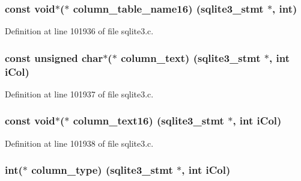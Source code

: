 \subsubsection[{column\+\_\+table\+\_\+name16}]{\setlength{\rightskip}{0pt plus 5cm}const void$\ast$($\ast$ column\+\_\+table\+\_\+name16) ({\bf sqlite3\+\_\+stmt} $\ast$, int)}\label{structsqlite3__api__routines_a5ab49c39dc125f958df10ecc88fd9b12}


Definition at line 101936 of file sqlite3.\+c.

\hypertarget{structsqlite3__api__routines_a66f8d504265c0869a251f94e96b1873f}{}
\subsubsection[{column\+\_\+text}]{\setlength{\rightskip}{0pt plus 5cm}const unsigned char$\ast$($\ast$ column\+\_\+text) ({\bf sqlite3\+\_\+stmt} $\ast$, int i\+Col)}\label{structsqlite3__api__routines_a66f8d504265c0869a251f94e96b1873f}


Definition at line 101937 of file sqlite3.\+c.

\hypertarget{structsqlite3__api__routines_a78b3c83097ee83e73ed99b4267d229e5}{}
\subsubsection[{column\+\_\+text16}]{\setlength{\rightskip}{0pt plus 5cm}const void$\ast$($\ast$ column\+\_\+text16) ({\bf sqlite3\+\_\+stmt} $\ast$, int i\+Col)}\label{structsqlite3__api__routines_a78b3c83097ee83e73ed99b4267d229e5}


Definition at line 101938 of file sqlite3.\+c.

\hypertarget{structsqlite3__api__routines_a492811fa922de6f677e915b1cf9a53a0}{}
\subsubsection[{column\+\_\+type}]{\setlength{\rightskip}{0pt plus 5cm}int($\ast$ column\+\_\+type) ({\bf sqlite3\+\_\+stmt} $\ast$, int i\+Col)}\label{structsqlite3__api__routines_a492811fa922de6f677e915b1cf9a53a0}


